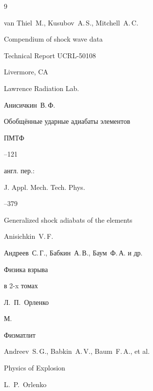 \begin{thebibliography}{9}




\by van Thiel~M., Kusubov~A.\,S., Mitchell~A.\,C.

\preprint Compendium of shock wave data

\preprintinfo  Technical Report UCRL-50108

\publaddr Livermore, CA

\publ Lawrence Radiation Lab.





\by Анисичкин~В.\,Ф.

\paper Обобщённые ударные адиабаты элементов

\jour ПМТФ



--121

\transl англ. пер.:~

\jour J. Appl. Mech. Tech. Phys.



--379


\paper Generalized shock adiabats of the elements

\by Anisichkin~V.\,F.






\by Андреев~С.\,Г.,  Бабкин~А.\,В., Баум~Ф.\,А. и др.

\book Физика взрыва

\bookinfo в 2-x томах

\ed Л.~П.~Орленко


\publaddr М.

\publ Физматлит



\misctransl

\by Andreev~S.\,G., Babkin~A.\,V., Baum~F.\,A., et al.

\book Physics of Explosion

\ed L.~P.~Orlenko 


\end{thebibliography}
